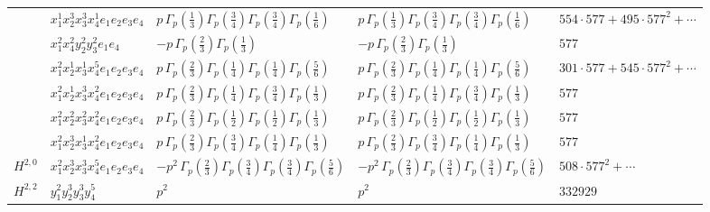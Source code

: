 \documentclass[11pt]{article}
\begin{document}
\begin{table}[ht]
{\begin{tabular}{@{}lllll@{}}
 & $x_{1}^{1} x_{2}^{3} x_{3}^{3} x_{4}^{1}  e_{1} e_{2} e_{3} e_{4}$ & $p \, \Gamma_p \left( \frac{1}{3} \right) \Gamma_p \left( \frac{3}{4} \right) \Gamma_p \left( \frac{3}{4} \right) \Gamma_p \left( \frac{1}{6} \right)$ & $p \, \Gamma_p \left( \frac{1}{3} \right) \Gamma_p \left( \frac{3}{4} \right) \Gamma_p \left( \frac{3}{4} \right) \Gamma_p \left( \frac{1}{6} \right)$ & $554{\cdot}577{+}495{\cdot}577^{2}{+}\cdots$ \\
 & $x_{1}^{2} x_{4}^{2} y_{2}^{2} y_{3}^{2} e_{1} e_{4}$ & $- p \, \Gamma_p \left( \frac{2}{3} \right) \Gamma_p \left( \frac{1}{3} \right)$ & $- p \, \Gamma_p \left( \frac{2}{3} \right) \Gamma_p \left( \frac{1}{3} \right)$ & $577$ \\
 & $x_{1}^{2} x_{2}^{1} x_{3}^{1} x_{4}^{5}  e_{1} e_{2} e_{3} e_{4}$ & $p \, \Gamma_p \left( \frac{2}{3} \right) \Gamma_p \left( \frac{1}{4} \right) \Gamma_p \left( \frac{1}{4} \right) \Gamma_p \left( \frac{5}{6} \right)$ & $p \, \Gamma_p \left( \frac{2}{3} \right) \Gamma_p \left( \frac{1}{4} \right) \Gamma_p \left( \frac{1}{4} \right) \Gamma_p \left( \frac{5}{6} \right)$ & $301{\cdot}577{+}545{\cdot}577^{2}{+}\cdots$ \\
 & $x_{1}^{2} x_{2}^{1} x_{3}^{3} x_{4}^{2}  e_{1} e_{2} e_{3} e_{4}$ & $p \, \Gamma_p \left( \frac{2}{3} \right) \Gamma_p \left( \frac{1}{4} \right) \Gamma_p \left( \frac{3}{4} \right) \Gamma_p \left( \frac{1}{3} \right)$ & $p \, \Gamma_p \left( \frac{2}{3} \right) \Gamma_p \left( \frac{1}{4} \right) \Gamma_p \left( \frac{3}{4} \right) \Gamma_p \left( \frac{1}{3} \right)$ & $577$ \\
 & $x_{1}^{2} x_{2}^{2} x_{3}^{2} x_{4}^{2}  e_{1} e_{2} e_{3} e_{4}$ & $p \, \Gamma_p \left( \frac{2}{3} \right) \Gamma_p \left( \frac{1}{2} \right) \Gamma_p \left( \frac{1}{2} \right) \Gamma_p \left( \frac{1}{3} \right)$ & $p \, \Gamma_p \left( \frac{2}{3} \right) \Gamma_p \left( \frac{1}{2} \right) \Gamma_p \left( \frac{1}{2} \right) \Gamma_p \left( \frac{1}{3} \right)$ & $577$ \\
 & $x_{1}^{2} x_{2}^{3} x_{3}^{1} x_{4}^{2}  e_{1} e_{2} e_{3} e_{4}$ & $p \, \Gamma_p \left( \frac{2}{3} \right) \Gamma_p \left( \frac{3}{4} \right) \Gamma_p \left( \frac{1}{4} \right) \Gamma_p \left( \frac{1}{3} \right)$ & $p \, \Gamma_p \left( \frac{2}{3} \right) \Gamma_p \left( \frac{3}{4} \right) \Gamma_p \left( \frac{1}{4} \right) \Gamma_p \left( \frac{1}{3} \right)$ & $577$ \\
\midrule
$H^{2,0}$ & $x_{1}^{2} x_{2}^{3} x_{3}^{3} x_{4}^{5}  e_{1} e_{2} e_{3} e_{4}$ & $- p^{2} \, \Gamma_p \left( \frac{2}{3} \right) \Gamma_p \left( \frac{3}{4} \right) \Gamma_p \left( \frac{3}{4} \right) \Gamma_p \left( \frac{5}{6} \right)$ & $- p^{2} \, \Gamma_p \left( \frac{2}{3} \right) \Gamma_p \left( \frac{3}{4} \right) \Gamma_p \left( \frac{3}{4} \right) \Gamma_p \left( \frac{5}{6} \right)$ & $508{\cdot}577^{2}{+}\cdots$ \\
\midrule
$H^{2,2}$ & $y_{1}^{2} y_{2}^{3} y_{3}^{3} y_{4}^{5}$ & $p^{2} \,$ & $p^{2} \,$ & $332929$ \\
\bottomrule
\end{tabular}
}
\renewcommand{\arraystretch}{1.0}
\end{table}
\end{document}
